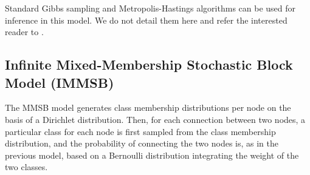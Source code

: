 Standard Gibbs sampling and Metropolis-Hastings algorithms can be used for inference in this model. We do not detail them here and refer the interested reader to \cite{ILFRM}.

%

\subsection{Infinite Mixed-Membership Stochastic Block Model (IMMSB)}

The MMSB model generates class membership distributions per node on the basis of a Dirichlet distribution. Then, for each connection between two nodes, a particular class for each node is first sampled from the class membership distribution, and the probability of connecting the two nodes is, as in the previous model, based on a Bernoulli distribution integrating the weight of the two classes. 

